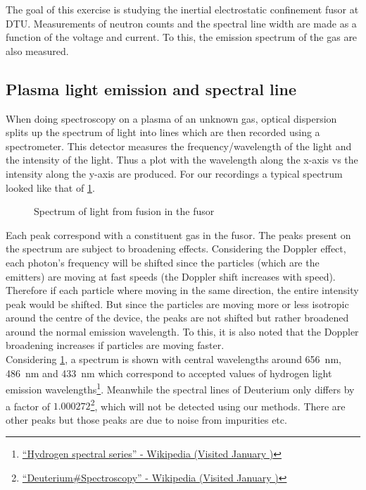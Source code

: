 The goal of this exercise is studying the inertial electrostatic confinement fusor at DTU. Measurements of neutron counts and the spectral line width are made as a function of the voltage and current. To this, the emission spectrum of the gas are also measured.
\subsection{Plasma light emission and spectral line}
When doing spectroscopy on a plasma of an unknown gas, optical dispersion splits up the spectrum of light into lines which are then recorded using a spectrometer. This detector measures the frequency/wavelength of the light and the intensity of the light. Thus a plot with the wavelength along the x-axis vs the intensity along the y-axis are produced. For our recordings a typical spectrum looked like that of \cref{SPEC}.
\begin{figure}[H]
	\centering
	\caption{Spectrum of light from fusion in the fusor}
	\label{SPEC}
\end{figure}
Each peak correspond with a constituent gas in the fusor.
The peaks present on the spectrum are subject to broadening effects. Considering the Doppler effect, each photon's frequency will be shifted since the particles (which are the emitters) are moving at fast speeds (the Doppler shift increases with speed). Therefore if each particle where moving in the same direction, the entire intensity peak would be shifted. But since the particles are moving more or less isotropic around the centre of the device, the peaks are not shifted but rather broadened around the normal emission wavelength. To this, it is also noted that the Doppler broadening increases if particles are moving faster.\\
Considering \cref{SPEC}, a spectrum is shown with central wavelengths around \SI{656}{\nano\meter}, \SI{486}{\nano\meter} and \SI{433}{\nano\meter} which correspond to accepted values of hydrogen light emission wavelengths\footnote{\href{https://en.wikipedia.org/wiki/Hydrogen_spectral_series}{``Hydrogen spectral series'' - Wikipedia (Visited January )}}. Meanwhile the spectral lines of Deuterium only differs by a factor of $1.000272$\footnote{\href{https://en.wikipedia.org/wiki/Deuterium#Spectroscopy}{``Deuterium\#Spectroscopy'' - Wikipedia (Visited January )}}, which will not be detected using our methods. There are other peaks but those peaks are due to noise from impurities etc.\\
